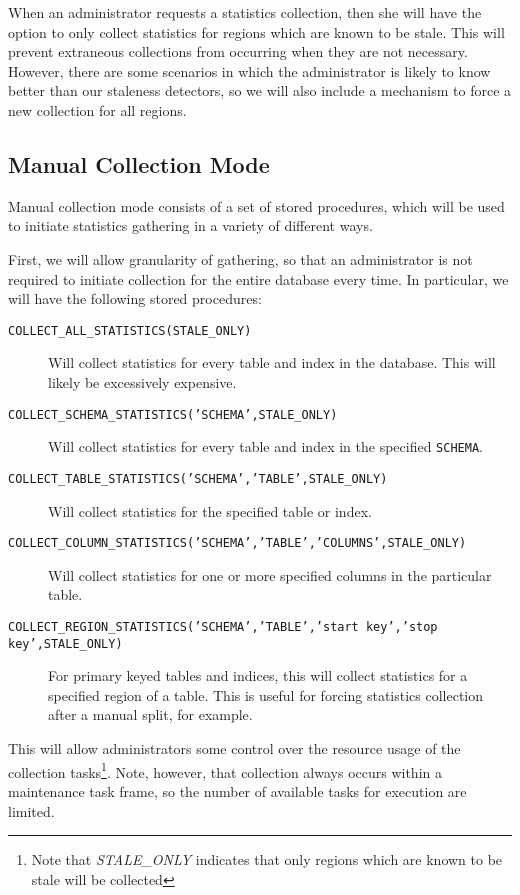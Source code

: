 When an administrator requests a statistics collection, then she will have the option to only collect statistics for regions which are known to be stale. This will prevent extraneous collections from occurring when they are not necessary. However, there are some scenarios in which the administrator is likely to know better than our staleness detectors, so we will also include a mechanism to force a new collection for all regions.

\subsection{Manual Collection Mode}
\label{sec:ManualCollection}
Manual collection mode consists of a set of stored procedures, which will be used to initiate statistics gathering in a variety of different ways.

First, we will allow granularity of gathering, so that an administrator is not required to initiate collection for the entire database every time. In particular, we will have the following stored procedures:

\begin{description}
				\item[\texttt{COLLECT\_ALL\_STATISTICS(STALE\_ONLY)}] Will collect statistics for every table and index in the database. This will likely be excessively expensive.
				\item[\texttt{COLLECT\_SCHEMA\_STATISTICS('SCHEMA',STALE\_ONLY)}] Will collect statistics for every table and index in the specified \texttt{SCHEMA}. 
				\item[\texttt{COLLECT\_TABLE\_STATISTICS('SCHEMA','TABLE',STALE\_ONLY)}] Will collect statistics for the specified table or index.
				\item[\texttt{COLLECT\_COLUMN\_STATISTICS('SCHEMA','TABLE','COLUMNS',STALE\_ONLY)}] Will collect statistics for one or more specified columns in the particular table.
				\item[\texttt{COLLECT\_REGION\_STATISTICS('SCHEMA','TABLE','start key','stop key',STALE\_ONLY)}] For primary keyed tables and indices, this will collect statistics for a specified region of a table. This is useful for forcing statistics collection after a manual split, for example.
\end{description}
This will allow administrators some control over the resource usage of the collection tasks\footnote{Note that \emph{STALE\_ONLY} indicates that only regions which are known to be stale will be collected}. Note, however, that collection always occurs within a maintenance task frame, so the number of available tasks for execution are limited. 

